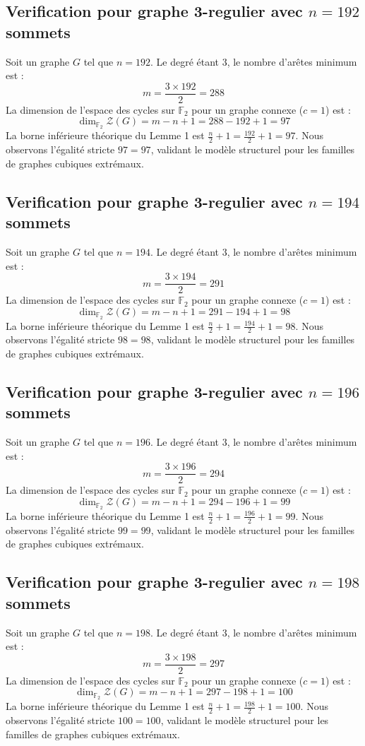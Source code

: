 \documentclass[11pt,a4paper]{article}
\begin{document}
\subsection{Verification pour graphe 3-regulier avec $n=192$ sommets}
Soit un graphe $G$ tel que $n = 192$. Le degré étant 3, le nombre d'arêtes minimum est :
$$ m = \frac{3 \times 192}{2} = 288 $$
La dimension de l'espace des cycles sur $\mathbb{F}_2$ pour un graphe connexe ($c=1$) est :
$$ \dim_{\mathbb{F}_2} \mathcal{Z}(G) = m - n + 1 = 288 - 192 + 1 = 97 $$
La borne inférieure théorique du Lemme 1 est $\frac{n}{2} + 1 = \frac{192}{2} + 1 = 97$.
Nous observons l'égalité stricte $97 = 97$, validant le modèle structurel pour les familles de graphes cubiques extrémaux.

\subsection{Verification pour graphe 3-regulier avec $n=194$ sommets}
Soit un graphe $G$ tel que $n = 194$. Le degré étant 3, le nombre d'arêtes minimum est :
$$ m = \frac{3 \times 194}{2} = 291 $$
La dimension de l'espace des cycles sur $\mathbb{F}_2$ pour un graphe connexe ($c=1$) est :
$$ \dim_{\mathbb{F}_2} \mathcal{Z}(G) = m - n + 1 = 291 - 194 + 1 = 98 $$
La borne inférieure théorique du Lemme 1 est $\frac{n}{2} + 1 = \frac{194}{2} + 1 = 98$.
Nous observons l'égalité stricte $98 = 98$, validant le modèle structurel pour les familles de graphes cubiques extrémaux.

\subsection{Verification pour graphe 3-regulier avec $n=196$ sommets}
Soit un graphe $G$ tel que $n = 196$. Le degré étant 3, le nombre d'arêtes minimum est :
$$ m = \frac{3 \times 196}{2} = 294 $$
La dimension de l'espace des cycles sur $\mathbb{F}_2$ pour un graphe connexe ($c=1$) est :
$$ \dim_{\mathbb{F}_2} \mathcal{Z}(G) = m - n + 1 = 294 - 196 + 1 = 99 $$
La borne inférieure théorique du Lemme 1 est $\frac{n}{2} + 1 = \frac{196}{2} + 1 = 99$.
Nous observons l'égalité stricte $99 = 99$, validant le modèle structurel pour les familles de graphes cubiques extrémaux.

\subsection{Verification pour graphe 3-regulier avec $n=198$ sommets}
Soit un graphe $G$ tel que $n = 198$. Le degré étant 3, le nombre d'arêtes minimum est :
$$ m = \frac{3 \times 198}{2} = 297 $$
La dimension de l'espace des cycles sur $\mathbb{F}_2$ pour un graphe connexe ($c=1$) est :
$$ \dim_{\mathbb{F}_2} \mathcal{Z}(G) = m - n + 1 = 297 - 198 + 1 = 100 $$
La borne inférieure théorique du Lemme 1 est $\frac{n}{2} + 1 = \frac{198}{2} + 1 = 100$.
Nous observons l'égalité stricte $100 = 100$, validant le modèle structurel pour les familles de graphes cubiques extrémaux.
\end{document}
